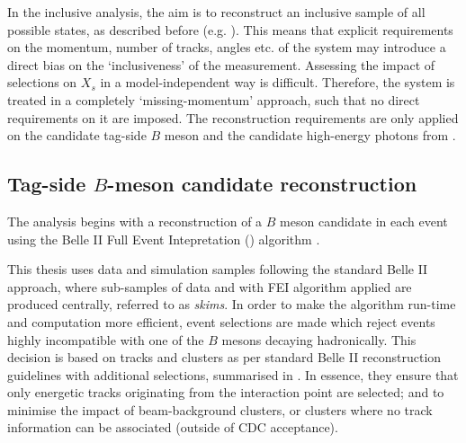 
In the inclusive \BtoXsgamma analysis, the aim is to reconstruct an inclusive sample of all possible \Xs states, 
as described before (e.g. ).
This means that explicit requirements on the momentum, number of tracks, angles etc. of the \Xs system may introduce a direct bias on the `inclusiveness' of the measurement.
Assessing the impact of selections on $X_s$ in a model-independent way is difficult.
Therefore, the \Xs system is treated in a completely `missing-momentum' approach, such that no direct requirements on it are imposed.
The reconstruction requirements are only applied on the candidate tag-side $B$ meson and the candidate high-energy photons from \BtoXsgamma.
\subsection{Tag-side \texorpdfstring{$B$}{B}-meson candidate reconstruction}

The analysis begins with a reconstruction of a $B$ meson candidate in each event using the Belle II Full Event Intepretation (\FEI) algorithm \cite{Keck:2017mui,Keck:2018lcd}.

This thesis uses data and simulation samples following the standard Belle II approach, where sub-samples of data and \MC with FEI algorithm applied are produced centrally, referred to as \textit{\FEI skims}.
In order to make the \FEI algorithm run-time and computation more efficient, event selections are made which reject events highly incompatible with one of the $B$ mesons decaying hadronically.
This decision is based on tracks and clusters as per standard Belle II reconstruction guidelines with additional selections, summarised in .
In essence, they ensure that only energetic tracks originating from the interaction point are selected;
and to minimise the impact of beam-background clusters, or clusters where no track information can be associated (outside of CDC acceptance).

\begin{table}[htbp!]
    \centering
     \caption{\label{tab:fei_objects} Definitions for \FEI event pre-selection.}
\end{table}

